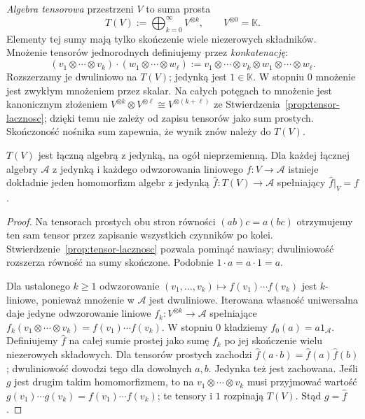 \begin{samepage}
\begin{definicja}
\label{def:algebra-tensorowa}
\emph{Algebra tensorowa} przestrzeni $V$ to suma prosta
\[
 T(V):=\bigoplus_{k=0}^{\infty}V^{\otimes k},
 \qquad V^{\otimes0}=\mathbb K.
\]
Elementy tej sumy mają tylko skończenie wiele niezerowych
składników. Mnożenie tensorów jednorodnych definiujemy przez
\emph{konkatenację}:
\[
 (v_1\otimes\cdots\otimes v_k)
 \cdot(w_1\otimes\cdots\otimes w_\ell)
 :=v_1\otimes\cdots\otimes v_k\otimes w_1\otimes\cdots\otimes w_\ell.
\]
Rozszerzamy je dwuliniowo na $T(V)$; jedynką jest $1\in\mathbb K$.
W stopniu $0$ mnożenie jest zwykłym mnożeniem przez skalar.
Na całych potęgach to mnożenie jest kanonicznym złożeniem
$V^{\otimes k}\otimes V^{\otimes\ell}\cong V^{\otimes(k+\ell)}$
ze Stwierdzenia~\ref{prop:tensor-lacznosc}; dzięki temu nie zależy
od zapisu tensorów jako sum prostych. Skończoność nośnika sum
zapewnia, że wynik znów należy do $T(V)$.
\end{definicja}
\end{samepage}

\begin{twierdzenie}
\label{thm:algebra-tensorowa-universal}
$T(V)$ jest łączną algebrą z jedynką, na ogół nieprzemienną.
Dla każdej łącznej algebry $\mathcal A$ z jedynką i każdego
odwzorowania liniowego $f\colon V\to\mathcal A$ istnieje dokładnie jeden
homomorfizm algebr z jedynką $\widehat f\colon T(V)\to\mathcal A$
spełniający $\widehat f|_V=f$.
\end{twierdzenie}
\begin{proof}
Na tensorach prostych obu stron równości
$(ab)c=a(bc)$ otrzymujemy ten sam tensor przez zapisanie
wszystkich czynników po kolei. Stwierdzenie~\ref{prop:tensor-lacznosc}
pozwala pominąć nawiasy; dwuliniowość rozszerza równość
na sumy skończone. Podobnie $1\cdot a=a\cdot1=a$.

Dla ustalonego $k\geq1$ odwzorowanie
$(v_1,\ldots,v_k)\mapsto f(v_1)\cdots f(v_k)$
jest $k$-liniowe, ponieważ mnożenie w $\mathcal A$ jest
dwuliniowe. Iterowana własność uniwersalna daje jedyne odwzorowanie
liniowe $f_k\colon V^{\otimes k}\to\mathcal A$ spełniające
$f_k(v_1\otimes\cdots\otimes v_k)=f(v_1)\cdots f(v_k)$.
W stopniu $0$ kładziemy $f_0(a)=a1_{\mathcal A}$.
Definiujemy $\widehat f$ na całej sumie prostej jako sumę
$f_k$ po jej skończenie wielu niezerowych składowych.
Dla tensorów prostych zachodzi
$\widehat f(a\cdot b)=\widehat f(a)\widehat f(b)$;
dwuliniowość dowodzi tego dla dowolnych $a,b$.
Jedynka też jest zachowana. Jeśli $g$ jest drugim takim
homomorfizmem, to na $v_1\otimes\cdots\otimes v_k$
musi przyjmować wartość $g(v_1)\cdots g(v_k)
=f(v_1)\cdots f(v_k)$; te tensory i $1$ rozpinają $T(V)$.
Stąd $g=\widehat f$.
\end{proof}

